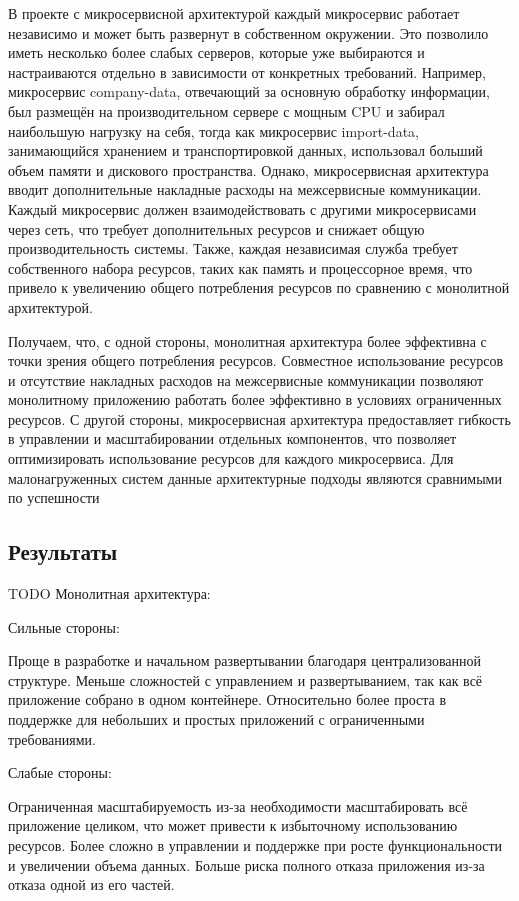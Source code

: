     В проекте с микросервисной архитектурой каждый микросервис работает независимо и может быть развернут в собственном окружении. Это позволило иметь несколько более слабых серверов, которые уже выбираются и настраиваются отдельно в зависимости от конкретных требований. Например, микросервис company-data, отвечающий за основную обработку информации, был размещён на производительном сервере с мощным CPU и забирал наибольшую нагрузку на себя, тогда как микросервис import-data, занимающийся хранением и транспортировкой данных, использовал больший объем памяти и дискового пространства. Однако, микросервисная архитектура вводит дополнительные накладные расходы на межсервисные коммуникации. Каждый микросервис должен взаимодействовать с другими микросервисами через сеть, что требует дополнительных ресурсов и снижает общую производительность системы. Также, каждая независимая служба требует собственного набора ресурсов, таких как память и процессорное время, что привело к увеличению общего потребления ресурсов по сравнению с монолитной архитектурой.
    
    Получаем, что, с одной стороны, монолитная архитектура более эффективна с точки зрения общего потребления ресурсов. Совместное использование ресурсов и отсутствие накладных расходов на межсервисные коммуникации позволяют монолитному приложению работать более эффективно в условиях ограниченных ресурсов. С другой стороны, микросервисная архитектура предоставляет гибкость в управлении и масштабировании отдельных компонентов, что позволяет оптимизировать использование ресурсов для каждого микросервиса. Для малонагруженных систем данные архитектурные подходы являются сравнимыми по успешности

\subsection{Результаты}
    TODO
    Монолитная архитектура:

    Сильные стороны:
    
        Проще в разработке и начальном развертывании благодаря централизованной структуре.
        Меньше сложностей с управлением и развертыванием, так как всё приложение собрано в одном контейнере.
        Относительно более проста в поддержке для небольших и простых приложений с ограниченными требованиями.
    
    Слабые стороны:
    
        Ограниченная масштабируемость из-за необходимости масштабировать всё приложение целиком, что может привести к избыточному использованию ресурсов.
        Более сложно в управлении и поддержке при росте функциональности и увеличении объема данных.
        Больше риска полного отказа приложения из-за отказа одной из его частей.
    
